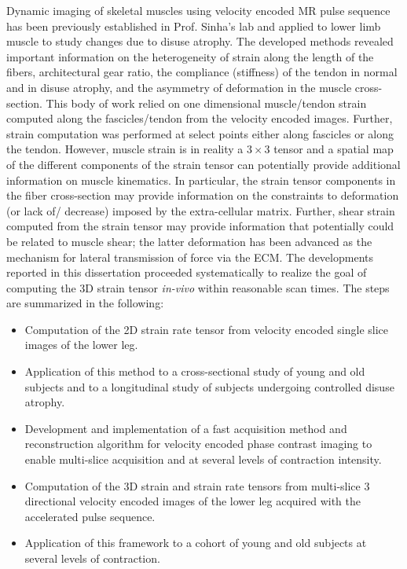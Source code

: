 Dynamic imaging of skeletal muscles using velocity encoded MR pulse sequence has been previously established in Prof. Sinha's lab and applied to lower limb muscle to study changes due to disuse atrophy. 
The developed methods revealed important information on the heterogeneity of strain along the length of the fibers, architectural gear ratio, the compliance (stiffness) of the tendon in normal and in disuse atrophy, and the asymmetry of deformation in the muscle cross-section. 
This body of work relied on one dimensional muscle/tendon strain computed along the fascicles/tendon from the velocity encoded images. 
Further, strain computation was performed at select points either along fascicles or along the tendon. 
However, muscle strain is in reality a $3 \times 3$ tensor and a spatial map of the different components of the strain tensor can potentially provide additional information on muscle kinematics. 
In particular, the strain tensor components in the fiber cross-section may provide information on the constraints to deformation (or lack of/ decrease) imposed by the extra-cellular matrix. 
Further, shear strain computed from the strain tensor may provide information that potentially could be related to muscle shear; the latter deformation has been advanced as the mechanism for lateral transmission of force via the ECM. 
The developments reported in this dissertation proceeded systematically to realize the goal of computing the 3D strain tensor \textit{in-vivo} within reasonable scan times. 
The steps are summarized in the following: 
\begin{itemize}
\item Computation of the 2D strain rate tensor from velocity encoded single slice images of the lower leg.
\item Application of this method to a cross-sectional study of young and old subjects and to a longitudinal study of subjects undergoing controlled disuse atrophy.
\item Development and implementation of a fast acquisition method and reconstruction algorithm for velocity encoded phase contrast imaging to enable multi-slice acquisition and at several levels of contraction intensity.
\item Computation of the 3D strain and strain rate tensors from multi-slice 3 directional velocity encoded images of the lower leg acquired with the accelerated pulse sequence.
\item Application of this framework to a cohort of young and old subjects at several levels of contraction.	
\end{itemize}

